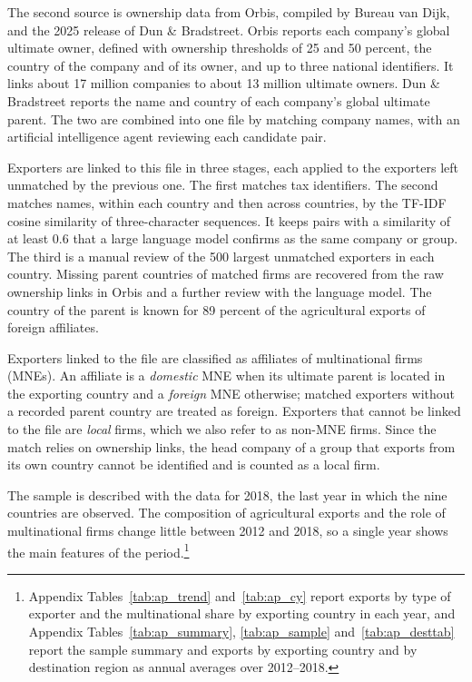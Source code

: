 The second source is ownership data from Orbis, compiled by Bureau van Dijk, and the 2025 release of Dun \&
Bradstreet. Orbis reports each company's global ultimate owner, defined with ownership thresholds of 25 and 50
percent, the country of the company and of its owner, and up to three national identifiers. It links about 17
million companies to about 13 million ultimate owners. Dun \& Bradstreet reports the name and country of each
company's global ultimate parent. The two are combined into one file by matching company names, with an artificial
intelligence agent reviewing each candidate pair.

Exporters are linked to this file in three stages, each applied to the exporters left unmatched by the previous
one. The first matches tax identifiers. The second matches names, within each country and then across countries,
by the TF-IDF cosine similarity of three-character sequences. It keeps pairs with a similarity of at least 0.6 that
a large language model confirms as the same company or group. The third is a manual review of the 500 largest
unmatched exporters in each country. Missing parent countries of matched firms are recovered from the raw ownership
links in Orbis and a further review with the language model. The country of the parent is known for 89 percent of
the agricultural exports of foreign affiliates.

Exporters linked to the file are classified as affiliates of multinational firms (MNEs). An
affiliate is a \emph{domestic} MNE when its ultimate parent is located in the exporting country
and a \emph{foreign} MNE otherwise; matched exporters without a recorded parent country are treated
as foreign. Exporters that cannot be linked to the file are \emph{local} firms, which we also refer
to as non-MNE firms. Since the match relies on ownership links, the head company of a group that
exports from its own country cannot be identified and is counted as a local firm.

The sample is described with the data for 2018, the last year in which the nine countries are observed. The
composition of agricultural exports and the role of multinational firms change little between 2012 and 2018, so a
single year shows the main features of the period.\footnote{Appendix Tables~\ref{tab:ap_trend} and~\ref{tab:ap_cy} report exports by type of exporter and the multinational share by exporting country in each year, and Appendix Tables~\ref{tab:ap_summary}, \ref{tab:ap_sample} and~\ref{tab:ap_desttab} report the sample summary and exports by exporting country and by destination region as annual averages over 2012--2018.}

